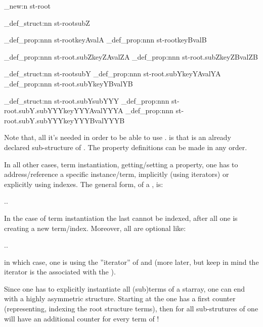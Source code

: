 \documentclass[10pt]{article}
\begin{document}
\begin{codestore}[store-env=demo3]
\starray_new:n {st-root}

\starray_def_struct:nn {st-root}{subZ}

\starray_def_prop:nnn {st-root}{keyA}{valA}
\starray_def_prop:nnn {st-root}{keyB}{valB}

\starray_def_prop:nnn {st-root.subZ}{keyZA}{valZA}
\starray_def_prop:nnn {st-root.subZ}{keyZB}{valZB}

\starray_def_struct:nn {st-root}{subY}
\starray_def_prop:nnn {st-root.subY}{keyYA}{valYA}
\starray_def_prop:nnn {st-root.subY}{keyYB}{valYB}

\starray_def_struct:nn {st-root.subY}{subYYY}
\starray_def_prop:nnn {st-root.subY.subYYY}{keyYYYA}{valYYYA}
\starray_def_prop:nnn {st-root.subY.subYYY}{keyYYYB}{valYYYB}
  
\end{codestore}


Note that, all it's needed in order to be able to use . is that  is an already declared sub-structure of . The property definitions can be made in any order.

In all other cases, term instantiation, getting/setting a property, one has to address/reference a specific instance/term, implicitly (using iterators) or explicitly using indexes.
The general form, of a , is: \par
{}.. \par
In the case of term instantiation the last  cannot be indexed, after all one is creating a new term/index. Moreover, all  are optional like:\par
{}.. \par
in which case, one is using the ''iterator'' of  and  (more later, but keep in mind the  iterator is the  associated with the ).

Since one has to explicitly instantiate all (sub)terms of a starray, one can end with a highly asymmetric structure. Starting at the  one has a first counter (representing, indexing the root structure terms), then for all sub-strutures of  one will have an additional counter for every term of  !
\end{document}

